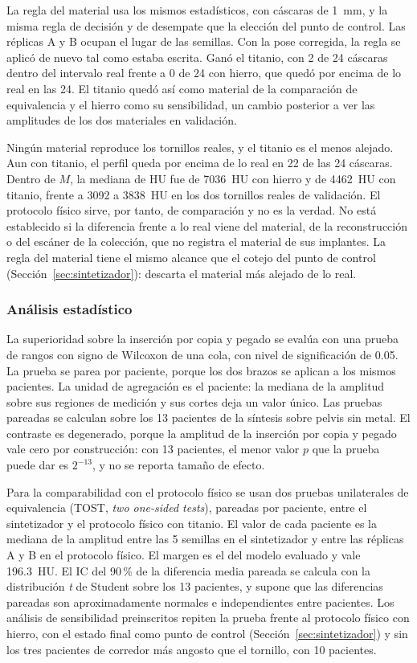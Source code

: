 La regla del material usa los mismos estadísticos, con cáscaras de 1~mm, y la misma regla de decisión y de desempate que la elección del punto de control. Las réplicas A y B ocupan el lugar de las semillas. Con la pose corregida, la regla se aplicó de nuevo tal como estaba escrita. Ganó el titanio, con 2 de 24 cáscaras dentro del intervalo real frente a 0 de 24 con hierro, que quedó por encima de lo real en las 24. El titanio quedó así como material de la comparación de equivalencia y el hierro como su sensibilidad, un cambio posterior a ver las amplitudes de los dos materiales en validación.

Ningún material reproduce los tornillos reales, y el titanio es el menos alejado. Aun con titanio, el perfil queda por encima de lo real en 22 de las 24 cáscaras. Dentro de $M$, la mediana de HU fue de 7036~HU con hierro y de 4462~HU con titanio, frente a 3092 a 3838~HU en los dos tornillos reales de validación. El protocolo físico sirve, por tanto, de comparación y no es la verdad. No está establecido si la diferencia frente a lo real viene del material, de la reconstrucción o del escáner de la colección, que no registra el material de sus implantes. La regla del material tiene el mismo alcance que el cotejo del punto de control (Sección~\ref{sec:sintetizador}): descarta el material más alejado de lo real.

\subsubsection{Análisis estadístico}\label{sec:ap-analisis}

La superioridad sobre la inserción por copia y pegado se evalúa con una prueba de rangos con signo de Wilcoxon de una cola, con nivel de significación de 0.05. La prueba se parea por paciente, porque los dos brazos se aplican a los mismos pacientes. La unidad de agregación es el paciente: la mediana de la amplitud sobre sus regiones de medición y sus cortes deja un valor único. Las pruebas pareadas se calculan sobre los 13 pacientes de la síntesis sobre pelvis sin metal. El contraste es degenerado, porque la amplitud de la inserción por copia y pegado vale cero por construcción: con 13 pacientes, el menor valor $p$ que la prueba puede dar es $2^{-13}$, y no se reporta tamaño de efecto.

Para la comparabilidad con el protocolo físico se usan dos pruebas unilaterales de equivalencia (TOST, \emph{two one-sided tests}), pareadas por paciente, entre el sintetizador y el protocolo físico con titanio. El valor de cada paciente es la mediana de la amplitud entre las 5 semillas en el sintetizador y entre las réplicas A y B en el protocolo físico. El margen es el del modelo evaluado y vale 196.3~HU. El IC del 90\,\% de la diferencia media pareada se calcula con la distribución \emph{t} de Student sobre los 13 pacientes, y supone que las diferencias pareadas son aproximadamente normales e independientes entre pacientes. Los análisis de sensibilidad preinscritos repiten la prueba frente al protocolo físico con hierro, con el estado final como punto de control (Sección~\ref{sec:sintetizador}) y sin los tres pacientes de corredor más angosto que el tornillo, con 10 pacientes.

